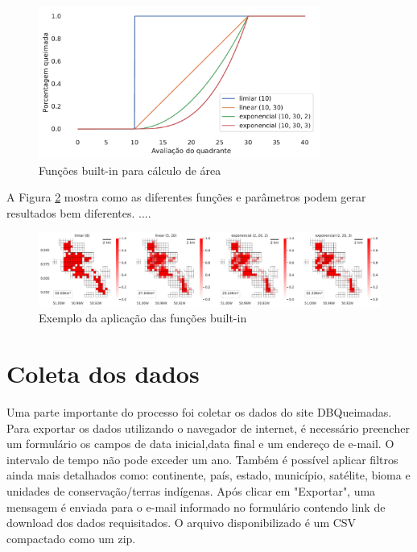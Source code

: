 \documentclass[cic,tc]{iiufrgs}
\begin{document}
\begin{figure}[H]
    \caption{Funções built-in para cálculo de área}
    \begin{center}
        \includegraphics[width=25em]{eval_func_built_in}
    \end{center}
    \label{fig:eval_func_built_in}
\end{figure}

A Figura \ref{fig:aplicacao_funcoes_built_in} mostra como as diferentes funções e parâmetros podem gerar resultados bem diferentes. .... \par

\begin{figure}[H]
    \caption{Exemplo da aplicação das funções built-in}
    \begin{center}
        \includegraphics[width=35em]{aplicacao_funcoes_built_in}
    \end{center}
    \label{fig:aplicacao_funcoes_built_in}
\end{figure}


\section{Coleta dos dados}

Uma parte importante do processo foi coletar os dados do site DBQueimadas. Para exportar os dados utilizando o navegador de internet, é necessário preencher um formulário os campos de data inicial,data final e um endereço de e-mail. O intervalo de tempo não pode exceder um ano. Também é possível aplicar filtros ainda mais detalhados como: continente, país, estado, município, satélite, bioma e unidades de conservação/terras indígenas. Após clicar em "Exportar", uma mensagem é enviada para o e-mail informado no formulário contendo link de download dos dados requisitados. O arquivo disponibilizado é um CSV compactado como um zip. \par
\end{document}
